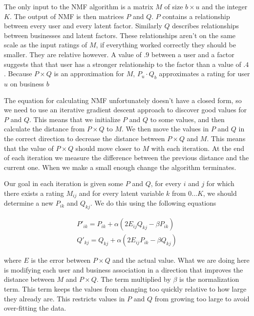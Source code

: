 The only input to the NMF algorithm is a matrix $M$ of size $b \times u$ and the
integer $K$. The output of NMF is then matrices $P$ and $Q$. $P$ contains a
relationship between every user and every latent factor. Similarly $Q$ describes
relationships between businesses and latent factors. These relationships aren't
on the same scale as the input ratings of $M$, if everything worked correctly
they should be smaller. They are relative however. A value of $.9$ between a
user and a factor suggests that that user has a stronger relationship to the
factor than a value of $.4$. Because $P \times Q$ is an approximation for $M$,
$P_u \cdot Q_b$ approximates a rating for user $u$ on business $b$

The equation for calculating NMF unfortunately doesn't have a closed form, so we
need to use an iterative gradient descent approach to discover good values for
$P$ and $Q$. This means that we initialize $P$ and $Q$ to some values, and then
calculate the distance from $P \times Q$ to $M$. We then move the values in $P$
and $Q$ in the correct direction to decrease the distance between $P \times Q$
and $M$. This means that the value of $P \times Q$ should move closer to $M$
with each iteration. At the end of each iteration we measure the difference
between the previous distance and the current one. When we make a small enough
change the algorithm terminates.

Our goal in each iteration is given some $P$ and $Q$, for every $i$ and $j$ for
which there exists a rating $M_{ij}$ and for every latent variable $k$ from
$0\ldots K$, we should determine a new $P_{ik}$ and $Q_{kj}$. We do this using the
following equations

\[
\begin{array}{c}
P'_{ik}=P_{ik} + \alpha(2E_{ij}Q_{kj}-\beta P_{ik}) \\
Q'_{kj}=Q_{kj} + \alpha(2E_{ij}P_{ik}-\beta Q_{kj})
\end{array}
\]

\noindent where $E$ is the error between $P \times Q$ and the actual value. What
we are doing here is modifying each user and business association in a direction
that improves the distance between $M$ and $P \times Q$. The term multiplied by
$\beta$ is the normalization term. This term keeps the values from changing too
quickly relative to how large they already are. This restricts values in $P$ and
$Q$ from growing too large to avoid over-fitting the data.


